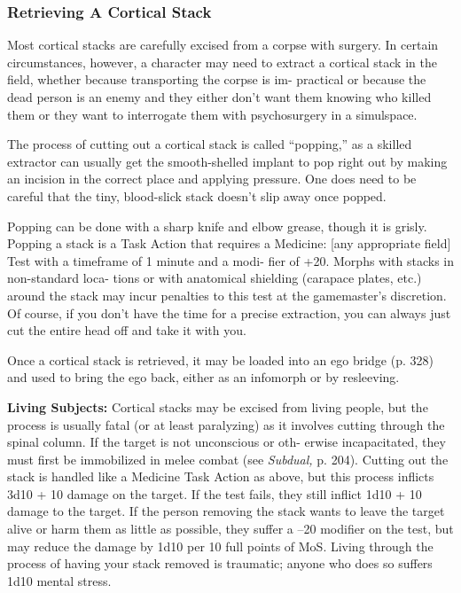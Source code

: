 \subsubsection{Retrieving A Cortical Stack}

Most cortical stacks are carefully excised from a 
corpse with surgery. In certain circumstances, however, 
a character may need to extract a cortical stack in the 
field, whether because transporting the corpse is im-
practical or because the dead person is an enemy and 
they either don't want them knowing who killed them 
or they want to interrogate them with psychosurgery 
in a simulspace.

The process of cutting out a cortical stack is called 
``popping,'' as a skilled extractor can usually get the 
smooth-shelled implant to pop right out by making 
an incision in the correct place and applying pressure. 
One does need to be careful that the tiny, blood-slick 
stack doesn't slip away once popped.

Popping can be done with a sharp knife and elbow 
grease, though it is grisly. Popping a stack is a Task 
Action that requires a Medicine: [any appropriate 
field] Test with a timeframe of 1 minute and a modi-
fier of +20. Morphs with stacks in non-standard loca-
tions or with anatomical shielding (carapace plates, 
etc.) around the stack may incur penalties to this test 
at the gamemaster's discretion. Of course, if you don't 
have the time for a precise extraction, you can always 
just cut the entire head off and take it with you.

Once a cortical stack is retrieved, it may be loaded 
into an ego bridge (p. 328) and used to bring the ego 
back, either as an infomorph or by resleeving.

\textbf{Living Subjects:} Cortical stacks may be excised 
from living people, but the process is usually fatal (or 
at least paralyzing) as it involves cutting through the 
spinal column. If the target is not unconscious or oth-
erwise incapacitated, they must first be immobilized 
in melee combat (see \textit{Subdual,} p. 204). Cutting out 
the stack is handled like a Medicine Task Action as 
above, but this process inflicts 3d10 + 10 damage on 
the target. If the test fails, they still inflict 1d10 + 10 
damage to the target. If the person removing the stack 
wants to leave the target alive or harm them as little 
as possible, they suffer a –20 modifier on the test, but 
may reduce the damage by 1d10 per 10 full points of 
MoS. Living through the process of having your stack 
removed is traumatic; anyone who does so suffers 
1d10 mental stress.

